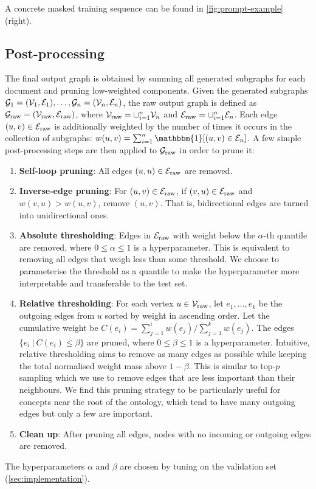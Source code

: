 A concrete masked training sequence can be found in \cref{fig:prompt-example} (right).

\subsection{Post-processing}  \label{sec:method:post-processing}

The final output graph is obtained by summing all generated subgraphs for each document and pruning low-weighted components. Given the generated subgraphs $\mathcal{G}_1 = (\mathcal{V}_1, \mathcal{E}_1), \dots, \mathcal{G}_n = (\mathcal{V}_n, \mathcal{E}_n)$, the raw output graph is defined as $\mathcal{G}_\text{raw} = (\mathcal{V}_\text{raw}, \mathcal{E}_\text{raw})$, where $\mathcal{V}_\text{raw} = \cup_{i=1}^n \mathcal{V}_n$ and $\mathcal{E}_\text{raw} = \cup_{i=1}^n \mathcal{E}_n$. Each edge $(u, v) \in \mathcal{E}_\text{raw}$ is additionally weighted by the number of times it occurs in the collection of subgraphs: $w(u, v) = \sum_{i=1}^n \mathbbm{1}[(u,v) \in \E_n]$. A few simple post-processing steps are then applied to $\mathcal{G}_\text{raw}$ in order to prune it:
\begin{enumerate}
    \item \textbf{Self-loop pruning}: All edges $(u, u) \in \mathcal{E}_\text{raw}$ are removed.
    \item \textbf{Inverse-edge pruning}: For $(u, v) \in \mathcal{E}_\text{raw}$, if $(v, u) \in \mathcal{E}_\text{raw}$ and $w(v, u) > w(u, v)$, remove $(u, v)$. That is, bidirectional edges are turned into unidirectional ones.
    \item \textbf{Absolute thresholding}: Edges in $\mathcal{E}_\text{raw}$ with weight below the $\alpha$-th quantile are removed, where $0 \leq \alpha \leq 1$ is a hyperparameter. This is equivalent to removing all edges that weigh less than some threshold. We choose to parameterise the threshold as a quantile to make the hyperparameter more interpretable and transferable to the test set.
    \item \textbf{Relative thresholding}: For each vertex $u \in \mathcal{V}_\text{raw}$, let $e_1, \dots, e_k$ be the outgoing edges from $u$ sorted by weight in ascending order. Let the cumulative weight be $C(e_i) = \sum_{j=1}^i w(e_j) / \sum_{j=1}^k w(e_j)$. The edges $\{e_i\ |\ C(e_i) \leq \beta\}$ are pruned, where $0 \leq \beta \leq 1$ is a hyperparameter. Intuitive, relative thresholding aims to remove as many edges as possible while keeping the total normalised weight mass above $1-\beta$. This is similar to top-$p$ sampling \cite{holtzman2019curious} which we use to remove edges that are less important than their neighbours. We find this pruning strategy to be particularly useful for concepts near the root of the ontology, which tend to have many outgoing edges but only a few are important.
    \item \textbf{Clean up}: After pruning all edges, nodes with no incoming or outgoing edges are removed.
\end{enumerate}
The hyperparameters $\alpha$ and $\beta$ are chosen by tuning on the validation set (\cref{sec:implementation}).

